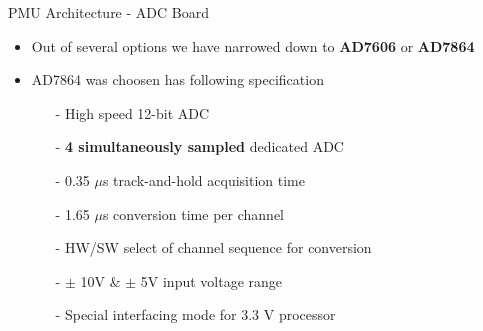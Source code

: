 \documentclass{beamer}
\begin{document}
\begin{frame}{PMU Architecture - ADC Board}

\begin{itemize}
\item Out of several options we have narrowed down to \textbf{AD7606} or \textbf{AD7864}
\item AD7864 was choosen has following specification
\begin{itemize}
	\item[-] High speed 12-bit ADC 
	\item[-] \textbf{4 simultaneously sampled} dedicated ADC
	\item[-] 0.35 $\mu$s track-and-hold acquisition time 
	\item[-] 1.65 $\mu$s conversion time per channel 
	\item[-] HW/SW select of channel sequence for conversion 
	\item[-] $\pm$ 10V \& $\pm$ 5V input voltage range
	\item[-] Special interfacing mode for 3.3 V processor 
\end{itemize} 
\end{itemize}
\end{frame}
\end{document}
